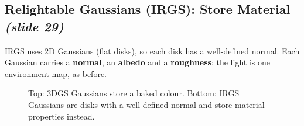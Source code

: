 \documentclass[11pt,a4paper]{article}
\theoremstyle{definition}
\theoremstyle{plain}
\theoremstyle{remark}
\newcommand{\slideone}[1]{\texorpdfstring{\emph{(slide #1)}}{(slide #1)}}
\newcommand{\w}{{\bm{\omega}}}
\begin{document}
\subsection{Relightable Gaussians (IRGS): Store Material \slideone{29}}

IRGS uses 2D Gaussians (flat disks), so each disk has a well-defined normal. Each Gaussian carries a \textbf{normal}, an \textbf{albedo} and a \textbf{roughness}; the light is one environment map, as before.

\begin{figure}[!htbp]\centering
\newcommand{\gaussians}{%
 \draw[-Latex,thick] (7.6,0)--(0.7,0);
 \draw[thick,fill=blue!35] (0.3,0) circle (0.22);
 \begin{scope}[rotate around={15:(2.6,0)}]\filldraw[fill=blue!25,draw=blue!50] (2.6,0) ellipse (0.95 and 0.3);\end{scope}
 \begin{scope}[rotate around={85:(4.6,0)}]\filldraw[fill=red!25,draw=red!50] (4.6,0) ellipse (0.8 and 0.28);\end{scope}
 \begin{scope}[rotate around={-30:(6.6,0)}]\filldraw[fill=violet!25,draw=violet!50] (6.6,0) ellipse (0.9 and 0.3);\end{scope}}
\caption{Top: 3DGS Gaussians store a baked colour. Bottom: IRGS Gaussians are disks with a well-defined normal and store material properties instead.}
\end{figure}
\end{document}
